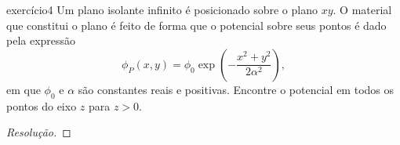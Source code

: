 \begin{exercício}{}{exercício4}
    Um plano isolante infinito é posicionado sobre o plano \(xy\). O material que constitui o plano é feito de forma que o potencial sobre seus pontos é dado pela expressão
    \begin{equation*}
        \phi_P(x,y) = \phi_0 \exp\left(- \frac{x^2 + y^2}{2 \alpha^2}\right),
    \end{equation*}
    em que \(\phi_0\) e \(\alpha\) são constantes reais e positivas. Encontre o potencial em todos os pontos do eixo \(z\) para \(z > 0\).
\end{exercício}
\begin{proof}[Resolução]

\end{proof}
